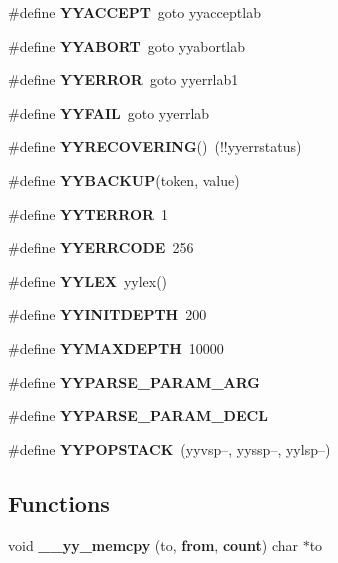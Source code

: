 \begin{CompactItemize}
\#define {\bf YYACCEPT}\ goto yyacceptlab
\item 
\#define {\bf YYABORT}\ goto yyabortlab
\item 
\#define {\bf YYERROR}\ goto yyerrlab1
\item 
\#define {\bf YYFAIL}\ goto yyerrlab
\item 
\#define {\bf YYRECOVERING}()\ (!!yyerrstatus)
\item 
\#define {\bf YYBACKUP}(token, value)
\item 
\#define {\bf YYTERROR}\ 1
\item 
\#define {\bf YYERRCODE}\ 256
\item 
\#define {\bf YYLEX}\ yylex()
\item 
\#define {\bf YYINITDEPTH}\ 200
\item 
\#define {\bf YYMAXDEPTH}\ 10000
\item 
\#define {\bf YYPARSE\_\-PARAM\_\-ARG}
\item 
\#define {\bf YYPARSE\_\-PARAM\_\-DECL}
\item 
\#define {\bf YYPOPSTACK}\ (yyvsp--, yyssp--, yylsp--)
\end{CompactItemize}
\subsection*{Functions}
\begin{CompactItemize}
\item 
void {\bf \_\-\_\-yy\_\-memcpy} (to, {\bf from}, {\bf count}) char $\ast$to
\end{CompactItemize}
